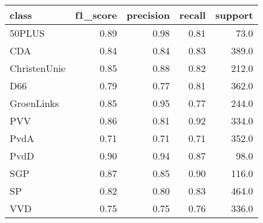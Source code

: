 \begin{tabular}{lrrrr}
\toprule
        class &  f1\_score &  precision &  recall &  support \\
\midrule
       50PLUS &      0.89 &       0.98 &    0.81 &     73.0 \\
          CDA &      0.84 &       0.84 &    0.83 &    389.0 \\
 ChristenUnie &      0.85 &       0.88 &    0.82 &    212.0 \\
          D66 &      0.79 &       0.77 &    0.81 &    362.0 \\
   GroenLinks &      0.85 &       0.95 &    0.77 &    244.0 \\
          PVV &      0.86 &       0.81 &    0.92 &    334.0 \\
         PvdA &      0.71 &       0.71 &    0.71 &    352.0 \\
         PvdD &      0.90 &       0.94 &    0.87 &     98.0 \\
          SGP &      0.87 &       0.85 &    0.90 &    116.0 \\
           SP &      0.82 &       0.80 &    0.83 &    464.0 \\
          VVD &      0.75 &       0.75 &    0.76 &    336.0 \\
\bottomrule
\end{tabular}
